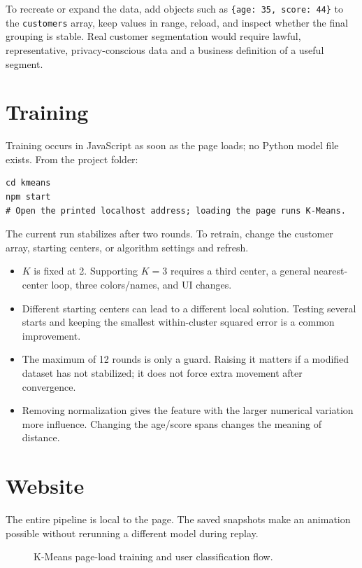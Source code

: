 \documentclass[12pt,a4paper,openany]{report}
\begin{document}
To recreate or expand the data, add objects such as
\texttt{\{age: 35, score: 44\}} to the \texttt{customers} array, keep values in
range, reload, and inspect whether the final grouping is stable. Real customer
segmentation would require lawful, representative, privacy-conscious data and
a business definition of a useful segment.

\section{Training}
Training occurs in JavaScript as soon as the page loads; no Python model file
exists. From the project folder:
\begin{lstlisting}[style=terminal]
cd kmeans
npm start
# Open the printed localhost address; loading the page runs K-Means.
\end{lstlisting}
The current run stabilizes after two rounds. To retrain, change the customer
array, starting centers, or algorithm settings and refresh.

\begin{itemize}
  \item $K$ is fixed at 2. Supporting $K=3$ requires a third center, a general
  nearest-center loop, three colors/names, and UI changes.
  \item Different starting centers can lead to a different local solution.
  Testing several starts and keeping the smallest within-cluster squared error
  is a common improvement.
  \item The maximum of 12 rounds is only a guard. Raising it matters if a
  modified dataset has not stabilized; it does not force extra movement after
  convergence.
  \item Removing normalization gives the feature with the larger numerical
  variation more influence. Changing the age/score spans changes the meaning
  of distance.
\end{itemize}

\section{Website}
The entire pipeline is local to the page. The saved snapshots make an animation
possible without rerunning a different model during replay.

\begin{figure}[H]
\centering
{}
\caption{K-Means page-load training and user classification flow.}
\end{figure}
\end{document}
